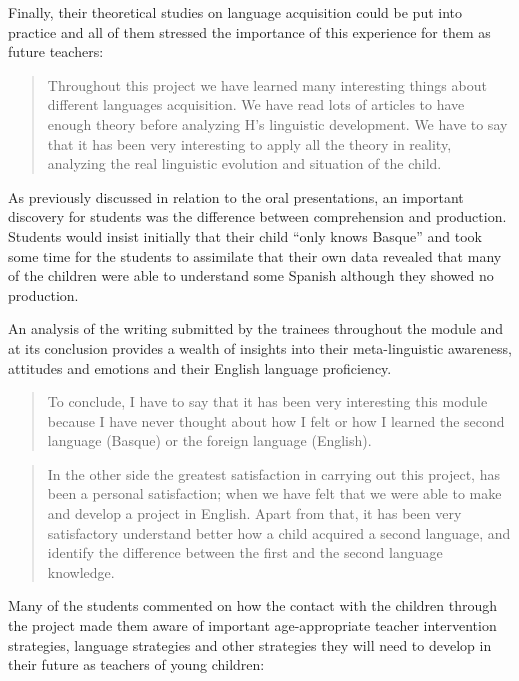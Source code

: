 \documentclass[output=paper]{../langscibook}
\begin{document}
Finally, their theoretical studies on language acquisition could be put into practice and all of them stressed the importance of this experience for them as future teachers:

\begin{quote}
Throughout this project we have learned many interesting things about different languages acquisition. We have read lots of articles to have enough theory before analyzing H’s linguistic development. We have to say that it has been very interesting to apply all the theory in reality, analyzing the real linguistic evolution and situation of the child.  
\end{quote}

As previously discussed in relation to the oral presentations, an important discovery for students was the difference between comprehension and production. Students would insist initially that their child “only knows Basque” and took some time for the students to assimilate that their own data revealed that many of the children were able to understand some Spanish although they showed no production.



An analysis of the writing submitted by the trainees throughout the module and at its conclusion provides a wealth of insights into their meta-linguistic awareness, attitudes and emotions and their English language proficiency.

\begin{quote}
To conclude, I have to say that it has been very interesting this module because I have never thought about how I felt or how I learned the second language (Basque) or the foreign language (English).
\end{quote}

\begin{quote}
In the other side the greatest satisfaction in carrying out this project, has been a personal satisfaction; when we have felt that we were able to make and develop a project in English. Apart from that, it has been very satisfactory understand better how a child acquired a second language, and identify the difference between the first and the second language knowledge.
\end{quote}



Many of the students commented on how the contact with the children through the project made them aware of important age-appropriate teacher intervention strategies, language strategies and other strategies they will need to develop in their future as teachers of young children: 
\end{document}
